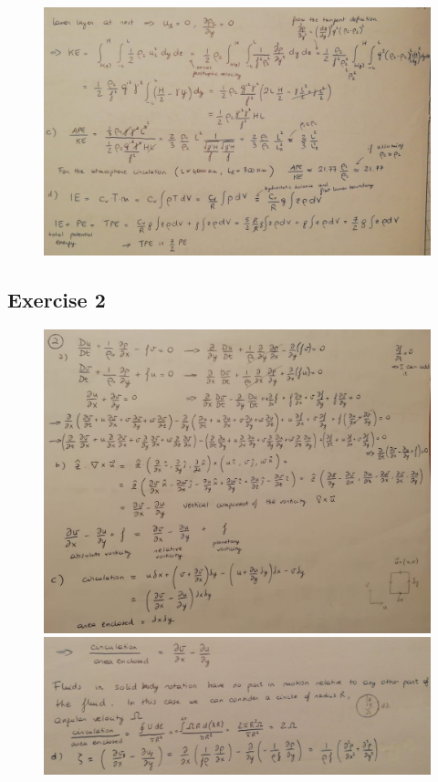\documentclass[11pt,a4paper]{article}
\begin{document}
\begin{figure}[H]
	\centering 
	\includegraphics[width=150mm]{images/es1_2.JPEG}
\end{figure}
	
\subsection{Exercise 2}
\begin{figure}[H]
	\centering \includegraphics[width=150mm]{images/es2.JPEG}
	
	\smallskip
	
	\includegraphics[width=150mm]{images/es2_1.JPEG}
\end{figure}
\end{document}
